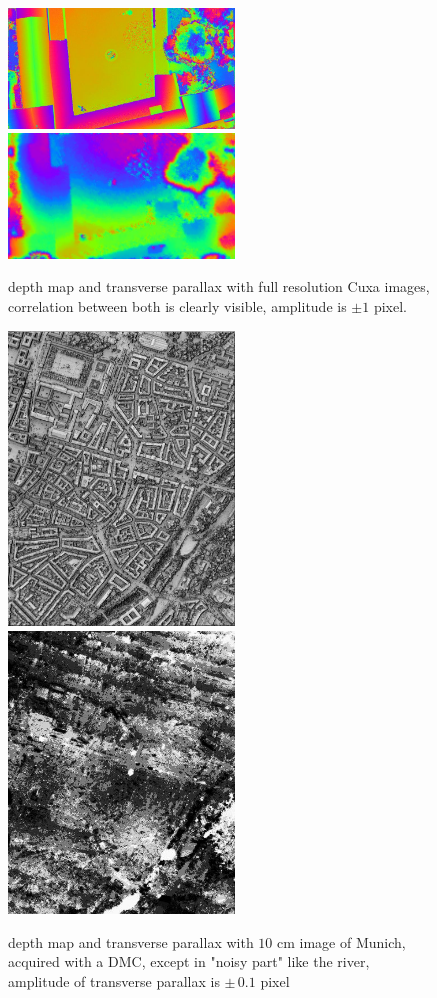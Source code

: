 \begin{figure}
\begin{center}
\includegraphics[width=60mm]{FIGS/TestOri/FullCuxPx1.jpg}
\includegraphics[width=60mm]{FIGS/TestOri/FullCuxPx2.jpg}
\end{center}
\caption{depth map and transverse parallax with full resolution Cuxa images,
correlation between both is clearly visible, amplitude is $\pm 1$ pixel.
}
\label{FIG:CuxaFull:PxTr}
\end{figure}


\begin{figure}
\begin{center}
\includegraphics[width=60mm]{FIGS/TestOri/Mun1.jpg}
\includegraphics[width=60mm]{FIGS/TestOri/Mun2.jpg}
\end{center}
\caption{depth map and transverse parallax with $10$ cm image of Munich, acquired with a DMC,
except in "noisy part" like the river, amplitude of transverse parallax is $\pm\, 0.1$ pixel
}
\label{FIG:Mubich:PxTr}
\end{figure}




